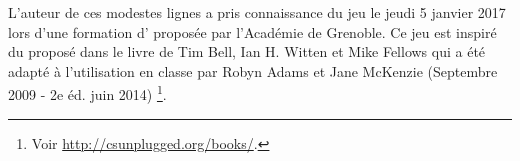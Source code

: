 L'auteur de ces modestes lignes a pris connaissance du jeu  le jeudi 5 janvier 2017 lors d'une formation d' proposée par l'Académie de Grenoble. Ce jeu est inspiré du  proposé dans le livre  de Tim Bell, Ian H. Witten et Mike Fellows qui a été adapté à l’utilisation en classe par Robyn Adams et Jane McKenzie (Septembre 2009 - 2e éd. juin 2014)
\footnote{
    Voir \url{http://csunplugged.org/books/}.
}.
